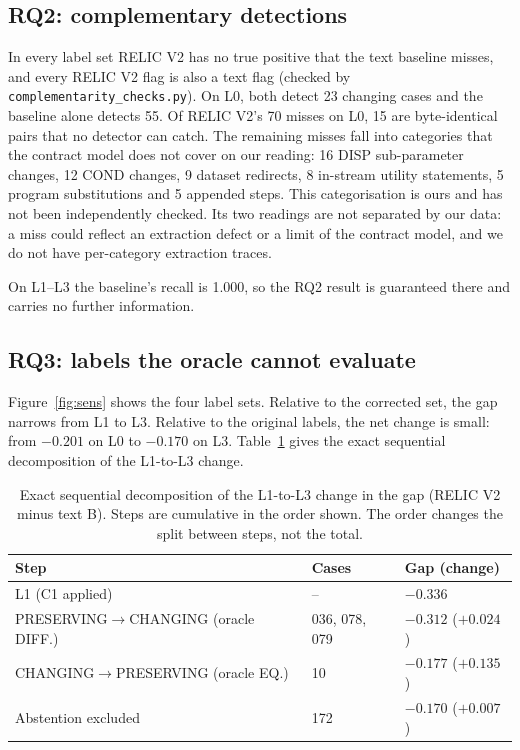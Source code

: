 \documentclass[conference]{IEEEtran}
\begin{document}
\subsection{RQ2: complementary detections}
In every label set RELIC V2 has no true positive that the text baseline misses, and every RELIC V2 flag is also a text flag (checked by \texttt{complementarity\_checks.py}). On L0, both detect 23 changing cases and the baseline alone detects 55. Of RELIC V2's 70 misses on L0, 15 are byte-identical pairs that no detector can catch. The remaining misses fall into categories that the contract model does not cover on our reading: 16 DISP sub-parameter changes, 12 COND changes, 9 dataset redirects, 8 in-stream utility statements, 5 program substitutions and 5 appended steps. This categorisation is ours and has not been independently checked. Its two readings are not separated by our data: a miss could reflect an extraction defect or a limit of the contract model, and we do not have per-category extraction traces.

On L1--L3 the baseline's recall is 1.000, so the RQ2 result is guaranteed there and carries no further information.

\subsection{RQ3: labels the oracle cannot evaluate}
Figure~\ref{fig:sens} shows the four label sets. Relative to the corrected set, the gap narrows from L1 to L3. Relative to the original labels, the net change is small: from $-0.201$ on L0 to $-0.170$ on L3. Table~\ref{tab:decomp} gives the exact sequential decomposition of the L1-to-L3 change.

\begin{table}[t]
\caption{Exact sequential decomposition of the L1-to-L3 change in the gap (RELIC V2 minus text B). Steps are cumulative in the order shown. The order changes the split between steps, not the total.}
\label{tab:decomp}
\centering
\small
\begin{tabular}{@{}p{3.6cm}p{1.9cm}p{1.9cm}@{}}
\toprule
Step & Cases & Gap (change) \\
\midrule
L1 (C1 applied) & -- & $-0.336$ \\
PRESERVING$\to$CHANGING (oracle DIFF.) & 036, 078, 079 & $-0.312$ ($+0.024$) \\
CHANGING$\to$PRESERVING (oracle EQ.) & 10 & $-0.177$ ($+0.135$) \\
Abstention excluded & 172 & $-0.170$ ($+0.007$) \\
\bottomrule
\end{tabular}
\end{table}
\end{document}

